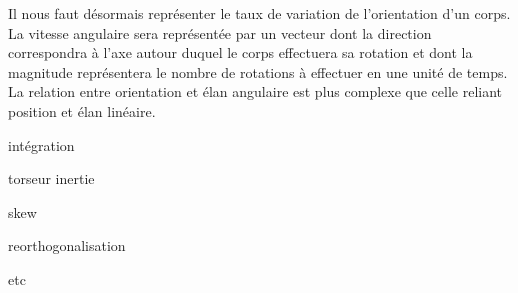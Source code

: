 Il nous faut désormais représenter le taux de variation de l'orientation d'un corps. La vitesse angulaire sera représentée par un vecteur dont la direction correspondra à l'axe autour duquel le corps effectuera sa rotation et dont la magnitude représentera le nombre de rotations à effectuer en une unité de temps. La relation entre orientation et élan angulaire est plus complexe que celle reliant position et élan linéaire.

intégration

torseur inertie

skew

reorthogonalisation

etc
